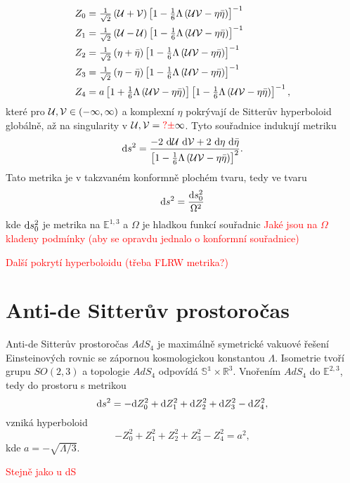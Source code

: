 \begin{equation}
     \begin{split}
          Z_0 &= \tfrac{1}{\sqrt{2}} \left(\mathcal{U} + \mathcal{V}\right) \left[1-\tfrac{1}{6} \Lambda \left(\mathcal{U} \mathcal{V} - \eta \bar{\eta}\right)\right]^{-1} \\
          Z_1 &= \tfrac{1}{\sqrt{2}} \left(\mathcal{U} - \mathcal{U}\right) \left[1-\tfrac{1}{6} \Lambda \left(\mathcal{U} \mathcal{V} - \eta \bar{\eta}\right)\right]^{-1} \\
          Z_2 &= \tfrac{1}{\sqrt{2}} \left(\eta + \bar{\eta}\right) \left[1-\tfrac{1}{6} \Lambda \left(\mathcal{U} \mathcal{V} - \eta \bar{\eta}\right)\right]^{-1} \\
          Z_3 &= \tfrac{1}{\sqrt{2}} \left(\eta - \bar{\eta}\right) \left[1-\tfrac{1}{6} \Lambda \left(\mathcal{U} \mathcal{V} - \eta \bar{\eta}\right)\right]^{-1} \\
          Z_4 &= a \left[1 + \tfrac{1}{6} \Lambda \left(\mathcal{U} \mathcal{V} - \eta \bar{\eta}\right)\right] \left[1-\tfrac{1}{6} \Lambda \left(\mathcal{U} \mathcal{V} - \eta \bar{\eta}\right)\right]^{-1},
     \end{split}
\end{equation}
které pro $\mathcal{U}, \mathcal{V} \in \left(-\infty, \infty\right)$ a komplexní $\eta$ pokrývají de Sitterův hyperboloid globálně, až na singularity v  $\mathcal{U}, \mathcal{V}=\textcolor{red}{?\pm}\infty$.
Tyto souřadnice indukují metriku
\begin{equation}
     \label{eq:konfmetric}
     \mathrm{d} s^2 = \frac{-2 ~ \mathrm{d} \mathcal{U} ~ \mathrm{d} \mathcal{V} + 2 ~ \mathrm{d} \eta ~ \mathrm{d} \bar{\eta}}{\left[1-\tfrac{1}{6} \Lambda \left(\mathcal{U} \mathcal{V} - \eta \bar{\eta}\right)\right]^2}.
\end{equation}
Tato metrika je v takzvaném konformně plochém tvaru, tedy ve tvaru
\begin{equation}
     \mathrm{d} s^2 = \frac{\mathrm{d} s_0^2}{\Omega^2}
\end{equation}
kde $\mathrm{d} s_0^2$ je metrika na $\mathbb{E}^{1,3}$ a $\Omega$ je hladkou funkcí souřadnic \textcolor{red}{Jaké jsou na $\Omega$ kladeny podmínky (aby se opravdu jednalo o konformní souřadnice)}

\textcolor{red}{Další pokrytí hyperboloidu (třeba FLRW metrika?)}


\section{Anti-de Sitterův prostoročas}

Anti-de Sitterův prostoročas $AdS_4$ je maximálně symetrické vakuové řešení Einsteinových rovnic se zápornou
kosmologickou konstantou $\Lambda$. Isometrie tvoří grupu $SO(2,3)$ a topologie $AdS_4$ odpovídá $\mathbb{S^1} \times \mathbb{R}^3$.
Vnořením $AdS_4$ do $\mathbb{E}^{2,3}$, tedy do prostoru s metrikou
\begin{equation}
     \mathrm{d} s^2 = -\mathrm{d} Z_0^2 + \mathrm{d} Z_1^2 + \mathrm{d} Z_2^2 + \mathrm{d} Z_3^2 - \mathrm{d} Z_4^2,
\end{equation}
vzniká hyperboloid
\begin{equation}
     -Z_0^2 + Z_1^2 + Z_2^2 + Z_3^2 - Z_4^2 = a^2,
\end{equation}
kde $a = -\sqrt{\Lambda/3}$.

\textcolor{red}{Stejně jako u dS}